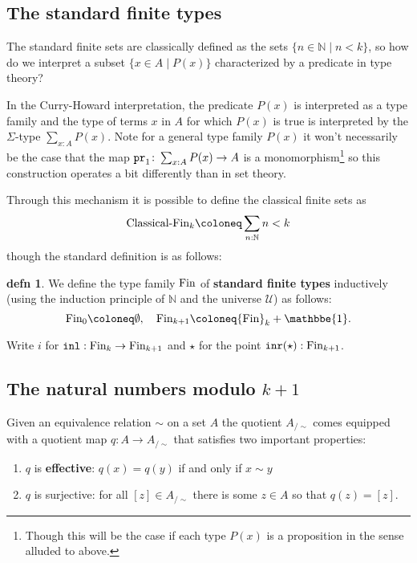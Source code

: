 \documentclass{amsart}
\theoremstyle{theorem}
\theoremstyle{definition}
\newtheorem*{defn}{defn}
\theoremstyle{remark}
\newcommand{\0}{\mathbbe{0}}
\newcommand{\1}{\mathbbe{1}}
\newcommand{\2}{\mathbbe{2}}
\newcommand{\3}{\mathbbe{3}}
\newcommand{\4}{\mathbbe{4}}
\newcommand{\term}[1]{{\textup{\texttt{#1}}}}
\newcommand{\type}[1]{{\textup{#1}}}
\newcommand{\bN}{{\mathbb{N}}}
\newcommand{\inl}{\term{inl}}
\newcommand{\inr}{\term{inr}}
\newcommand{\pr}{\term{pr}}
\newcommand{\UU}{\mathcal{U}}
\begin{document}
\subsection*{The standard finite types}

The standard finite sets are classically defined as the sets $\{ n \in \bN \mid n < k\}$, so how do we interpret a subset $\{ x  \in A \mid P(x)\}$ characterized by a predicate in type theory?

In the Curry-Howard interpretation, the predicate $P(x)$ is interpreted as a type family and the type of terms $x$ in $A$ for which $P(x)$ is true is interpreted by the $\Sigma$-type $\sum_{x : A} P(x)$. Note for a general type family $P(x)$ it won't necessarily be the case that the map $\pr_1 \colon \sum_{x :A} P(x) \to A$ is a monomorphism\footnote{Though this will be the case if each type $P(x)$ is a proposition in the sense alluded to above.} so this construction operates a bit differently than in set theory.

Through this mechanism it is possible to define the classical finite sets as 
\[ \type{Classical-Fin}_k \coloneq \sum_{n : \bN}n < k \]
though the standard definition is as follows:

\begin{defn} We define the type family $\type{Fin}$ of \textbf{standard finite types} inductively (using the induction principle of $\bN$ and the universe $\UU$) as follows:
\[ \type{Fin}_0 \coloneq \emptyset, \quad \type{Fin}_{k+1} \coloneq \type{Fin}_k + \1.\]
\end{defn}

Write $i$ for $\inl : \type{Fin}_k \to \type{Fin}_{k+1}$ and $\star$ for the point $\inr(\star) : \type{Fin}_{k+1}$.

\subsection*{The natural numbers modulo $k+1$}

Given an equivalence relation $\sim$ on a set $A$ the quotient $A_{/\sim}$ comes equipped with a quotient map $q \colon A \to A_{/\sim}$ that satisfies two important properties:
\begin{enumerate}
\item $q$ is \textbf{effective}: $q(x) = q(y)$ if and only if $x \sim y$
\item $q$ is surjective: for all $[z] \in A_{/\sim}$ there is some $z \in A$ so that $q(z) = [z]$.
\end{enumerate}
\end{document}
